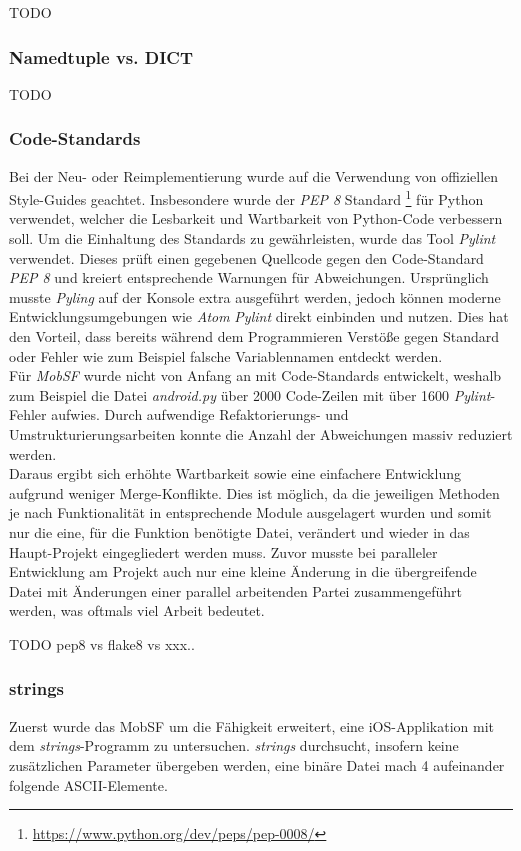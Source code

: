 TODO

\subsubsection{Namedtuple vs. DICT}
TODO

\subsubsection{Code-Standards}
\label{pylintering}
Bei der Neu- oder Reimplementierung wurde auf die Verwendung von offiziellen Style-Guides geachtet. Insbesondere wurde der\textit{ PEP 8} Standard \footnote{\url{https://www.python.org/dev/peps/pep-0008/}} für Python verwendet, welcher die Lesbarkeit und Wartbarkeit von Python-Code verbessern soll. Um die Einhaltung des Standards zu gewährleisten, wurde das Tool \textit{Pylint} verwendet. Dieses prüft einen gegebenen Quellcode gegen den Code-Standard \textit{PEP 8} und kreiert entsprechende Warnungen für Abweichungen. Ursprünglich musste \textit{Pyling} auf der Konsole extra ausgeführt werden, jedoch können moderne Entwicklungsumgebungen wie \textit{Atom} \textit{Pylint} direkt einbinden und nutzen. Dies hat den Vorteil, dass bereits während dem Programmieren Verstöße gegen Standard oder Fehler wie zum Beispiel falsche Variablennamen entdeckt werden.\\

Für \textit{MobSF} wurde nicht von Anfang an mit Code-Standards entwickelt, weshalb zum Beispiel die Datei \textit{android.py} über 2000 Code-Zeilen mit über 1600 \textit{Pylint}-Fehler aufwies. Durch aufwendige Refaktorierungs- und Umstrukturierungsarbeiten konnte die Anzahl der Abweichungen massiv reduziert werden.\\

Daraus ergibt sich erhöhte Wartbarkeit sowie eine einfachere Entwicklung aufgrund weniger Merge-Konflikte. Dies ist möglich, da die jeweiligen Methoden je nach Funktionalität in entsprechende Module ausgelagert wurden und somit nur die eine, für die Funktion benötigte Datei, verändert und wieder in das Haupt-Projekt eingegliedert werden muss. Zuvor musste bei paralleler Entwicklung am Projekt auch nur eine kleine Änderung in die übergreifende Datei mit Änderungen einer parallel arbeitenden Partei zusammengeführt werden, was oftmals viel Arbeit bedeutet.

TODO pep8 vs flake8 vs xxx..

\subsubsection{strings}
Zuerst wurde das MobSF um die Fähigkeit erweitert, eine iOS-Applikation mit dem \textit{strings}-Programm zu untersuchen. \textit{strings} durchsucht, insofern keine zusätzlichen Parameter übergeben werden, eine binäre Datei mach 4 aufeinander folgende ASCII-Elemente.\\

